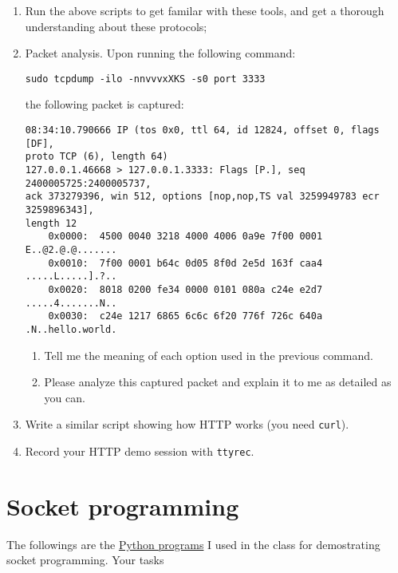 \documentclass{article}
\begin{document}
\begin{enumerate}
\item Run the above scripts to get familar with these tools, and get a thorough understanding about these protocols;

\item Packet analysis. Upon running the following command:

\begin{verbatim}
sudo tcpdump -ilo -nnvvvxXKS -s0 port 3333
\end{verbatim}

the following packet is captured:

\begin{verbatim}
08:34:10.790666 IP (tos 0x0, ttl 64, id 12824, offset 0, flags [DF],
proto TCP (6), length 64)
127.0.0.1.46668 > 127.0.0.1.3333: Flags [P.], seq 2400005725:2400005737,
ack 373279396, win 512, options [nop,nop,TS val 3259949783 ecr 3259896343],
length 12
    0x0000:  4500 0040 3218 4000 4006 0a9e 7f00 0001  E..@2.@.@.......
    0x0010:  7f00 0001 b64c 0d05 8f0d 2e5d 163f caa4  .....L.....].?..
    0x0020:  8018 0200 fe34 0000 0101 080a c24e e2d7  .....4.......N..
    0x0030:  c24e 1217 6865 6c6c 6f20 776f 726c 640a  .N..hello.world.
\end{verbatim}

\begin{enumerate}
\item Tell me the meaning of each option used in the previous command.

\item Please analyze this captured packet and explain it to me as detailed as you can.
\end{enumerate}

\item Write a similar script showing how HTTP works (you need \texttt{curl}).

\item Record your HTTP demo session with \texttt{ttyrec}.
\end{enumerate}

\section{Socket programming}
\label{sec:org50b25e8}

The followings are the \href{https://cs6.swfu.edu.cn/\~wx672/lecture\_notes/network\_basics/src/}{Python programs} I used in the class for demostrating
socket programming. Your tasks
\end{document}
